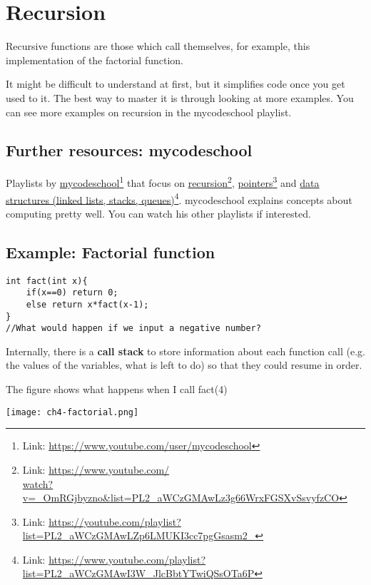 \chapter{Recursion}

Recursive functions are those which call themselves, for example, this implementation of the factorial function.

It might be difficult to understand at first, but it simplifies code once you get used to it. The best way to master it is through looking at more examples. You can see more examples on recursion in the mycodeschool playlist.

\section{Further resources: mycodeschool}

Playlists by 
\href{https://www.youtube.com/user/mycodeschool}{mycodeschool}\footnote{Link: \href{https://www.youtube.com/user/mycodeschool}{https://www.youtube.com/user/mycodeschool}}
that focus on 
\href{https://www.youtube.com/watch?v=_OmRGjbyzno&list=PL2_aWCzGMAwLz3g66WrxFGSXvSsvyfzCO}{recursion}\footnote{Link: \href{https://www.youtube.com/watch?v=_OmRGjbyzno&list=PL2_aWCzGMAwLz3g66WrxFGSXvSsvyfzCO}{https://www.youtube.com/\\watch?v=\_OmRGjbyzno\&list=PL2\_aWCzGMAwLz3g66WrxFGSXvSsvyfzCO}}, 
\href{https://youtube.com/playlist?list=PL2_aWCzGMAwLZp6LMUKI3cc7pgGsasm2_}{pointers}\footnote{Link: \href{https://youtube.com/playlist?list=PL2_aWCzGMAwLZp6LMUKI3cc7pgGsasm2_}{https://youtube.com/playlist?list=PL2\_aWCzGMAwLZp6LMUKI3cc7pgGsasm2\_}} and 
\href{https://www.youtube.com/playlist?list=PL2_aWCzGMAwI3W_JlcBbtYTwiQSsOTa6P}{data structures (linked lists, stacks, queues)}\footnote{Link: \href{https://www.youtube.com/playlist?list=PL2_aWCzGMAwI3W_JlcBbtYTwiQSsOTa6P}{https://www.youtube.com/playlist?list=PL2\_aWCzGMAwI3W\_JlcBbtYTwiQSsOTa6P}}.
mycodeschool explains concepts about computing pretty well. You can watch his other playlists if interested.

\section{Example: Factorial function}

\begin{lstlisting}
int fact(int x){
    if(x==0) return 0;
    else return x*fact(x-1);
}
//What would happen if we input a negative number?
\end{lstlisting}

Internally, there is a \textbf{call stack} to store information about each function call (e.g. the values of the variables, what is left to do) so that they could resume in order.

The figure shows what happens when I call fact(4)

\texttt{[image: ch4-factorial.png]}


